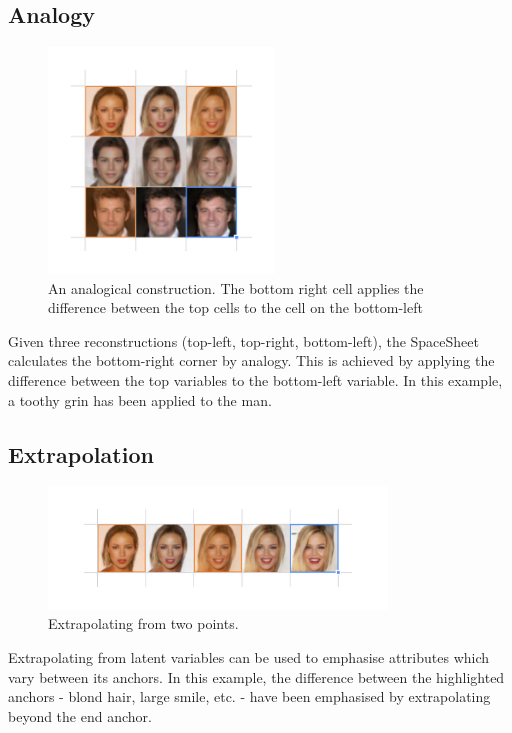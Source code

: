 \documentclass[letterpaper]{article}
\begin{document}
\newpage 
\subsection{Analogy}
\begin{figure}[ht!]
  \centering
  \includegraphics[width=6cm]{figs/07-analogy.jpg}
  \caption{An analogical construction. The bottom right cell applies the difference between the top cells to the cell on the bottom-left}
\end{figure}

Given three reconstructions (top-left, top-right, bottom-left), the SpaceSheet calculates the bottom-right corner by analogy. This is achieved by applying the difference between the top variables to the bottom-left variable. In this example, a toothy grin has been applied to the man.

\subsection{Extrapolation}
\begin{figure}[ht!]
  \centering
  \includegraphics[width=9cm]{figs/08-extrapolation.jpg}
  \caption{Extrapolating from two points.}
\end{figure}

Extrapolating from latent variables can be used to emphasise attributes which vary between its anchors. In this example, the difference between the highlighted anchors - blond hair, large smile, etc.  - have been emphasised by extrapolating beyond the end anchor.
\end{document}
